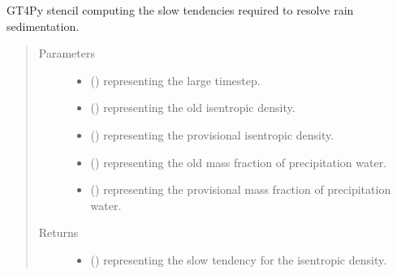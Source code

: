 \documentclass[letterpaper,10pt,english]{sphinxmanual}
\begin{document}
\begin{fulllineitems}
\begin{fulllineitems}
\end{fulllineitems}


\begin{fulllineitems}
\label{\detokenize{api:tasmania.dycore.prognostic_isentropic_nonconservative_centered.PrognosticIsentropicNonconservativeCentered._stencil_computing_slow_tendencies_defs}}
GT4Py stencil computing the slow tendencies required to resolve rain sedimentation.
\begin{quote}\begin{description}
\item[{Parameters}] \leavevmode\begin{itemize}
\item {} 
 () \textendash{}  representing the large timestep.

\item {} 
 () \textendash{}  representing the old isentropic density.

\item {} 
 () \textendash{}  representing the provisional isentropic density.

\item {} 
 () \textendash{}  representing the old mass fraction of precipitation water.

\item {} 
 () \textendash{}  representing the provisional mass fraction of precipitation water.

\end{itemize}

\item[{Returns}] \leavevmode
\begin{itemize}
\item {} 
 () \textendash{}  representing the slow tendency for the isentropic density.


\end{itemize}
\end{description}
\end{quote}
\end{fulllineitems}
\end{fulllineitems}
\end{document}
